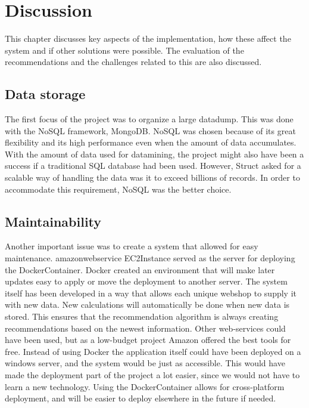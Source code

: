 
\chapter{Discussion} %

\label{Discussion} %

This chapter discusses key aspects of the implementation, how these affect the system and if other solutions were possible. The evaluation of the recommendations and the challenges related to this are also discussed.

\section{Data storage}
The first focus of the project was to organize a large datadump. This was done with the \gls{NoSQL} framework, \gls{MongoDB}. \Gls{NoSQL} was chosen because of its great flexibility and its high performance even when the amount of data accumulates. With the amount of data used for \gls{datamining}, the project might also have been a success if a traditional SQL database had been used. However, \gls{Struct} asked for a scalable way of handling the data was it to exceed billions of records. In order to accommodate this requirement, \gls{NoSQL} was the better choice.

\section{Maintainability}
Another important issue was to create a system that allowed for easy maintenance. \Gls{amazonwebservice} \gls{EC2Instance} served as the server for deploying the \gls{DockerContainer}. \Gls{Docker} created an environment that will make later updates easy to apply or move the deployment to another server. The system itself has been developed in a way that allows each unique webshop to supply it with new data. New calculations will automatically be done when new data is stored. This ensures that the recommendation algorithm is always creating recommendations based on the newest information. Other web-services could have been used, but as a low-budget project \gls{Amazon} offered the best tools for free.
Instead of using \gls{Docker} the application itself could have been deployed on a windows server, and the system would be just as accessible. This would have made the deployment part of the project a lot easier, since we would not have to learn a new technology. Using the \gls{DockerContainer} allows for cross-platform deployment, and will be easier to deploy elsewhere in the future if needed.

